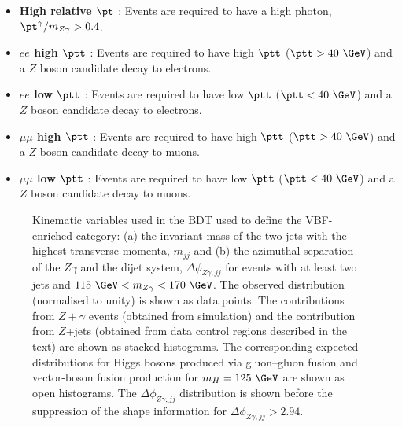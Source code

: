 \begin{itemize}
  The variable $\ptt$ is strongly correlated with the transverse momentum of the $Z\gamma$ system,
  but has better experimental resolution~\cite{Ackerstaff:1997rc, Vesterinen:2008hx}.
  Any requirement on $\Delta\phi_{Z\gamma,jj}$ effectively vetoes additional jets in the event by 
  restricting the phase space for additional emissions and, to avoid uncontrolled theoretical 
  uncertainties, the BDT does not use shape information for events with $\Delta\phi_{Z\gamma,jj}>2.94$ by
  merging these events into one bin. A minimum value of the BDT output (BDT > 0.82) is required. 
  The expected and
  observed distributions for two input variables, $m_{jj}$ as a typical variable to select
  events with VBF topology and $\Delta\phi_{Z\gamma,jj}$, which serves as an implicit third-jet
  veto, are shown in Figure~\ref{fig:VBFinputs} for
  selected events with at least two jets.
\item \textbf{High relative $\pt$} :
  Events are required to have a high \pt photon, $\pt^\gamma / m_{Z\gamma} > 0.4$.
\item \textbf{$ee$ high $\ptt$} : Events are required to have high $\ptt$ ($\ptt > 40~\GeV$) and a $Z$ boson candidate decay to electrons.
\item \textbf{$ee$ low $\ptt$} : Events are required to have low $\ptt$ ($\ptt < 40~\GeV$) and a $Z$ boson candidate decay to electrons.
\item \textbf{$\mu\mu$ high $\ptt$} : Events are required to have high $\ptt$ ($\ptt > 40~\GeV$) and a $Z$ boson candidate decay to muons.
\item \textbf{$\mu\mu$ low $\ptt$} : Events are required to have low $\ptt$ ($\ptt < 40~\GeV$) and a $Z$ boson candidate decay to muons.
\end{itemize}


\begin{figure}
%
\caption{Kinematic variables used in the BDT used to define the VBF-enriched category: 
(a) the invariant mass of the two jets with the highest
transverse momenta, $m_{jj}$ and (b) the azimuthal separation of the $Z\gamma$ and the dijet system,
$\Delta\phi_{Z\gamma, jj}$ for events with at least two jets and 
$115~\GeV < m_{Z\gamma} < 170~\GeV$. 
The observed distribution (normalised to unity) is shown as data points.
The contributions from $Z+\gamma$ events
(obtained from simulation) and the contribution from $Z$+jets 
(obtained from data control regions described in the text) are shown as stacked histograms.
The corresponding expected distributions for Higgs bosons produced via gluon--gluon fusion and vector-boson 
fusion production for $m_H = 125~\GeV$ are shown as open histograms.
The 
$\Delta\phi_{Z\gamma, jj}$ distribution is shown before the suppression of the shape information
for $\Delta\phi_{Z\gamma, jj}>2.94$.}
\label{fig:VBFinputs}
\end{figure}

